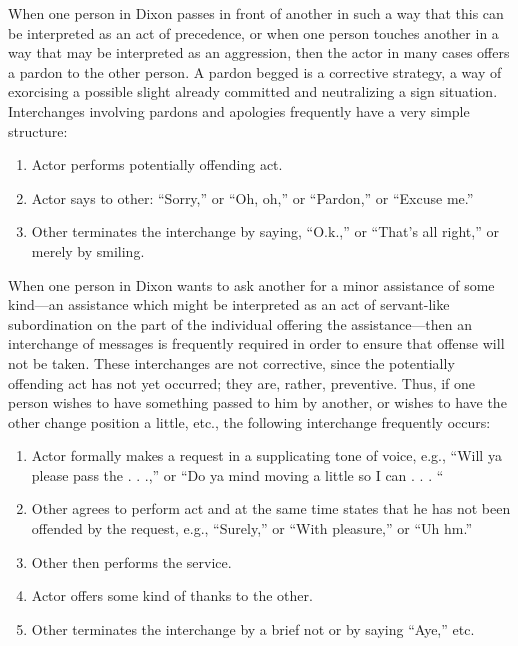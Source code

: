 \documentclass[twoside,symmetric,nobib,justified]{tufte-book}
\begin{document}
When one person in Dixon passes in front of another in such a way that
this can be interpreted as an act of precedence, or when one person
touches another in a way that may be interpreted as an aggression, then
the actor in many cases offers a pardon to the other person. A pardon
begged is a corrective strategy, a way of exorcising a possible slight
already committed and neutralizing a sign situation. Interchanges
involving pardons and apologies frequently have a very simple structure:

\begin{enumerate}
\item
  Actor performs potentially offending act.
\item
  Actor says to other: ``Sorry,'' or ``Oh, oh,'' or ``Pardon,'' or
  ``Excuse me.''
\item
  Other terminates the interchange by saying, ``O.k.,'' or ``That's all
  right,'' or merely by smiling.
\end{enumerate}

When one person in Dixon wants to ask another for a minor assistance of
some kind---an assistance which might be interpreted as an act of
servant-like subordination on the part of the individual offering the
assistance---then an interchange of messages is frequently required in
order to ensure that offense will not be taken. These interchanges are
not corrective, since the potentially offending act has not yet
occurred; they are, rather, preventive. Thus, if one person wishes to
have something passed to him by another, or wishes to have the other
change position a little, etc., the following interchange frequently
occurs:

\begin{enumerate}
\item
  Actor formally makes a request in a supplicating tone of voice, e.g.,
  ``Will ya please pass the . . .,'' or ``Do ya mind moving a little so
  I can . . . ``
\item
  Other agrees to perform act and at the same time states that he has
  not been offended by the request, e.g., ``Surely,'' or ``With
  pleasure,'' or ``Uh hm.''
\item
  Other then performs the service.
\item
  Actor offers some kind of thanks to the other.
\item
  Other terminates the interchange by a brief not or by saying ``Aye,''
  etc.
\end{enumerate}
\end{document}
